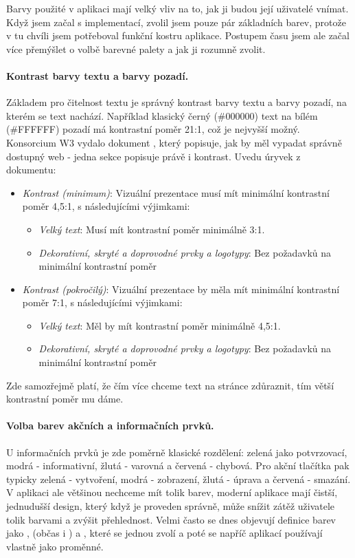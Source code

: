 Barvy použité v aplikaci mají velký vliv na to, jak ji budou její uživatelé vnímat. Když jsem začal s implementací, zvolil jsem pouze pár základních barev, protože v tu chvíli jsem potřeboval funkční kostru aplikace. Postupem času jsem ale začal více přemýšlet o volbě barevné palety a jak ji rozumně zvolit.

\paragraph{Kontrast barvy textu a barvy pozadí.} Základem pro čitelnost textu je správný kontrast barvy textu a barvy pozadí, na kterém se text nachází. Například klasický černý (\#000000) text na bílém (\#FFFFFF) pozadí má kontrastní poměr 21:1, což je nejvyšší možný. Konsorcium W3 vydalo dokument \cite{w3-access-guide}, který popisuje, jak by měl vypadat správně dostupný web - jedna sekce popisuje právě i kontrast. Uvedu úryvek z dokumentu:
\begin{itemize}
    \item \emph{Kontrast (minimum)}: Vizuální prezentace musí mít minimální kontrastní poměr 4,5:1, s následujícími výjimkami:
    \begin{itemize}
        \item \emph{Velký text}: Musí mít kontrastní poměr minimálně 3:1.
        \item \emph{Dekorativní, skryté a doprovodné prvky a logotypy}: Bez požadavků na minimální kontrastní poměr
    \end{itemize}
    \item \emph{Kontrast (pokročilý)}: Vizuální prezentace by měla mít minimální kontrastní poměr 7:1, s následujícími výjimkami:
    \begin{itemize}
        \item \emph{Velký text}: Měl by mít kontrastní poměr minimálně 4,5:1.
        \item \emph{Dekorativní, skryté a doprovodné prvky a logotypy}: Bez požadavků na minimální kontrastní poměr
    \end{itemize}
\end{itemize}

Zde samozřejmě platí, že čím více chceme text na stránce zdůraznit, tím větší kontrastní poměr mu dáme.

\paragraph{Volba barev akčních a informačních prvků.} U informačních prvků je zde poměrně klasické rozdělení: zelená jako potvrzovací, modrá - informativní, žlutá - varovná a červená - chybová. Pro akční tlačítka pak typicky zelená - vytvoření, modrá - zobrazení, žlutá - úprava a červená - smazání. V aplikaci ale většinou nechceme mít tolik barev, moderní aplikace mají čistší, jednudušší design, který když je proveden správně, může snížit zátěž uživatele tolik barvami a zvýšit přehlednost. Velmi často se dnes objevují definice barev jako ,  (občas i ) a , které se jednou zvolí a poté se napříč aplikací používají vlastně jako proměnné.

